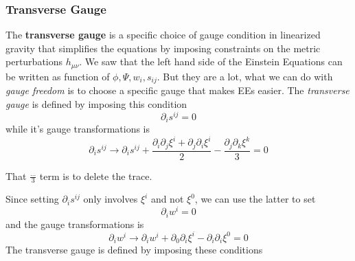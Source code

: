 \subsubsection{Transverse Gauge}

The \textbf{transverse gauge} is a specific choice of gauge condition in linearized gravity that simplifies the equations by imposing constraints on the metric perturbations $h_{\mu \nu }$. 
We saw that the left hand side of the Einstein Equations can be written as function of $\phi ,\Psi ,w_{i},s_{ij}$. But they are a lot, what we can do with \emph{gauge freedom} is to choose a specific gauge that makes EEs easier. The \emph{transverse gauge }is defined by imposing this condition
\[
\partial_{i}s^{ij} = 0	
\]
while it's gauge transformations is 
\[
\partial_{i} s^{ij} \to \partial_{i}s^{ij} + \frac{\partial_{i}\partial_{j}\xi ^{i}+\partial_{j}\partial_{i}\xi ^{i}}{2} - \frac{\partial_{j}\partial_{k}\xi ^{k}}{3} = 0
\]

That $ \frac{\ldots }{3}$ term is to delete the trace.\par

Since setting $\partial_{i}s^{ij}$ only involves $\xi ^{i}$ and not $\xi ^{0}$, we can use the latter to set
\[
\partial_{i}w^{i} = 0 
\]
and the gauge transformations is
\[
\partial_{i}w^{i} \to \partial_{i}w^{i}+ \partial_{0}\partial_{i}\xi ^{i} - \partial_{i}\partial_{i}\xi ^{0} = 0
\]
The transverse gauge is defined by imposing these conditions

